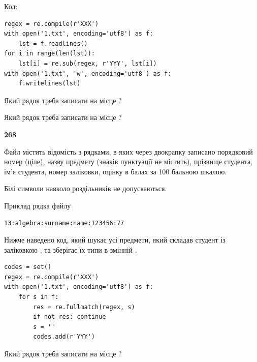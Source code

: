 Код:



\begin{verbatim}
regex = re.compile(r'XXX')
with open('1.txt', encoding='utf8') as f:
    lst = f.readlines()
for i in range(len(lst)):
    lst[i] = re.sub(regex, r'YYY', lst[i])
with open('1.txt', 'w', encoding='utf8') as f:
    f.writelines(lst)
\end{verbatim}







Який рядок треба записати на місце  ?\par
\vspace{5mm}


Який рядок треба записати на місце  ?\par


\newpage

{\begin {center}\textbf{ 268}\end {center}}\par
Файл  містить відомість з рядками, в яких через двокрапку записано поряд\-ковий номер (ціле), назву предмету (знаків пунктуації не містить), прізвище студента, ім'я студента, номер заліковки, оцінку в балах за 100 бальною шкалою.

Білі символи навколо роздільників не допускаються.

Приклад рядка файлу



\begin{verbatim}
13:algebra:surname:name:123456:77
\end{verbatim}


Нижче наведено код, який шукає усі предмети, який складав студент із заліковкою , та зберігає їх типи в змінній .



\begin{verbatim}
codes = set()
regex = re.compile(r'XXX')
with open('1.txt', encoding='utf8') as f:
    for s in f:
        res = re.fullmatch(regex, s)
        if not res: continue
        s = ''
        codes.add(r'YYY')
\end{verbatim}





Який рядок треба записати на місце  ?\par
\vspace{5mm}



